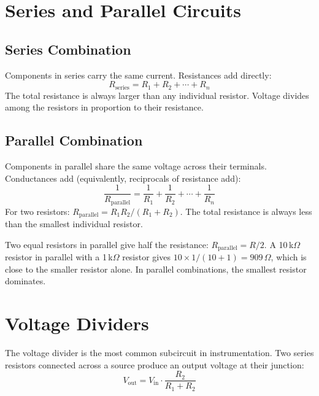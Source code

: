 \documentclass[11pt,letterpaper,twoside,openany]{book}
\begin{document}
\section{Series and Parallel Circuits}

\subsection{Series Combination}
Components in series carry the same current. Resistances add directly:
\begin{equation}
R_{\text{series}} = R_1 + R_2 + \cdots + R_n
\end{equation}
The total resistance is always larger than any individual resistor. Voltage divides among the resistors in proportion to their resistance.

\subsection{Parallel Combination}
Components in parallel share the same voltage across their terminals. Conductances add (equivalently, reciprocals of resistance add):
\begin{equation}
\frac{1}{R_{\text{parallel}}} = \frac{1}{R_1} + \frac{1}{R_2} + \cdots + \frac{1}{R_n}
\end{equation}
For two resistors: $R_{\text{parallel}} = R_1 R_2 / (R_1 + R_2)$. The total resistance is always less than the smallest individual resistor.

\begin{tipbox}
Two equal resistors in parallel give half the resistance: $R_{\text{parallel}} = R/2$. A 10\,k$\Omega$ resistor in parallel with a 1\,k$\Omega$ resistor gives $10 \times 1 / (10 + 1) = 909\,\Omega$, which is close to the smaller resistor alone. In parallel combinations, the smallest resistor dominates.
\end{tipbox}

\section{Voltage Dividers}

The voltage divider is the most common subcircuit in instrumentation. Two series resistors connected across a source produce an output voltage at their junction:
\begin{equation}
V_{\text{out}} = V_{\text{in}} \cdot \frac{R_2}{R_1 + R_2}
\end{equation}
\end{document}
